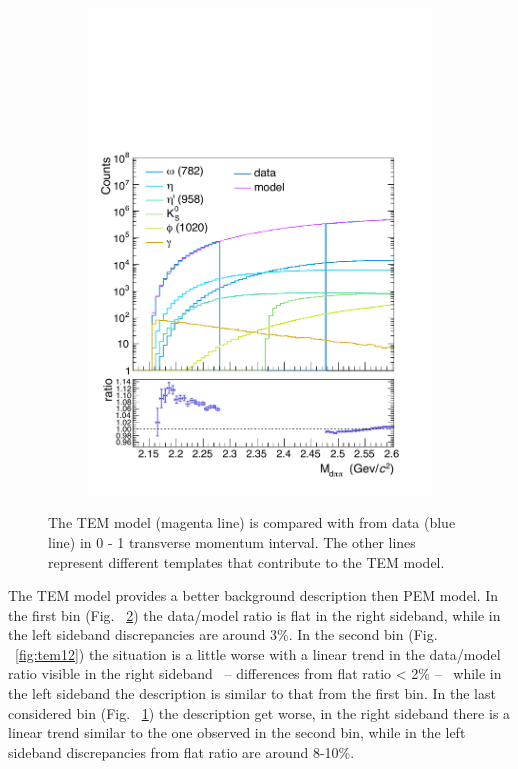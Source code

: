 \begin{figure}
\begin{subfigure}{.33\textwidth}
  \includegraphics[width=\linewidth]{gfx/can2}
  \caption{}
  \label{fig:tem23}
\end{subfigure}
\caption{The TEM model (magenta line) is compared with \minv from data (blue line) in 0 - 1 \gevc transverse momentum interval. The other lines represent different templates that contribute to the TEM model.}
\label{fig:tem01}
\end{figure}

The TEM model provides a better background description then PEM model. In the first \pt bin
(Fig. ~\ref{fig:tem01}) the data/model ratio is flat in the right sideband, while in the left sideband discrepancies
are around 3\%. In the second bin (Fig. ~\ref{fig:tem12}) the situation is a little worse with a linear trend
in the data/model ratio visible in the right sideband \ -- differences from flat ratio < 2\% -- \ while in
the left sideband the description is similar to that from the first bin. In the last considered bin
(Fig. ~\ref{fig:tem23}) the description get worse, in the right sideband there is a linear trend similar to
the one observed in the second bin, while in the left sideband discrepancies from flat ratio are
around 8-10\%.

